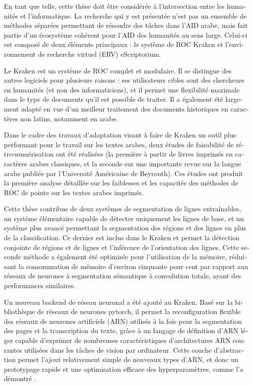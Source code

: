 \begin{french}
En tant que telle, cette thèse doit être considérée à l'intersection entre les 
humanités et l'informatique. La recherche qui y est
présentée n'est pas un ensemble de méthodes séparées permettant de
résoudre des tâches dans l'AID arabe, mais fait partie d'un écosystème
cohérent pour l'AID des humanités au sens large. Celui-ci est composé de deux éléments principaux :
le système de ROC Kraken et l'environnement de recherche virtuel (ERV)
eScriptorium.

Le Kraken est un système de ROC complet et modulaire. Il se distingue des autres
logiciels pour plusieurs raisons : ses utilisateurs cibles sont des chercheurs en humanités (et non des informaticiens), et il permet une flexibilité maximale dans le type de documents qu'il est possible de traiter. Il a également été largement adapté en vue d'un
meilleur traitement des documents historiques en caractères non latins,
notamment en arabe.

Dans le cadre des travaux d'adaptation visant à faire de Kraken un outil plus
performant pour le travail sur les textes arabes, deux études de faisabilité de
rétro-numérisation ont été réalisées (la première à partir de livres imprimés en caractères arabes classiques, et
la seconde sur une importante revue sur la langue arabe publiée par l'Université Américaine de
Beyrouth). Ces études ont produit la première analyse détaillée sur
les faiblesses et les capacités des méthodes de ROC de pointe sur les textes
arabes imprimés.

Cette thèse contribue de deux systèmes de segmentation de lignes entraînables,
un système élémentaire capable de détecter uniquement les lignes de base, et un
système plus avancé permettant la segmentation des régions et des lignes en
plus de la classification. Ce dernier est inclus dans le Kraken et permet la
détection conjointe de régions et de lignes et l'inférence de l'orientation des
lignes. Cette seconde méthode a également été optimisée pour l'utilisation de
la mémoire, réduisant la consommation de mémoire d'environ cinquante pour cent
par rapport aux réseaux de neurones à segmentation sémantique à convolution
totale, ayant des performances similaires.

Un nouveau backend de réseau neuronal a été ajouté au Kraken. Basé sur la
bibliothèque de réseaux de neurones pytorch, il permet la reconfiguration
flexible des réseaux de neurones artificiels (ARN) utilisés à la fois pour la
segmentation des pages et la transcription du texte, grâce à un langage de
définition d'ARN léger capable d'exprimer de nombreuses
caractéristiques d'architectures ARN courantes utilisées dans les tâches de
vision par ordinateur. Cette couche d'abstraction permet l'ajout relativement simple de
nouveaux types d'ARN, et donc un prototypage rapide et une optimisation efficace
des hyperparamètres, comme l'a démontré \cite{strobel2020much}.


\end{french}

